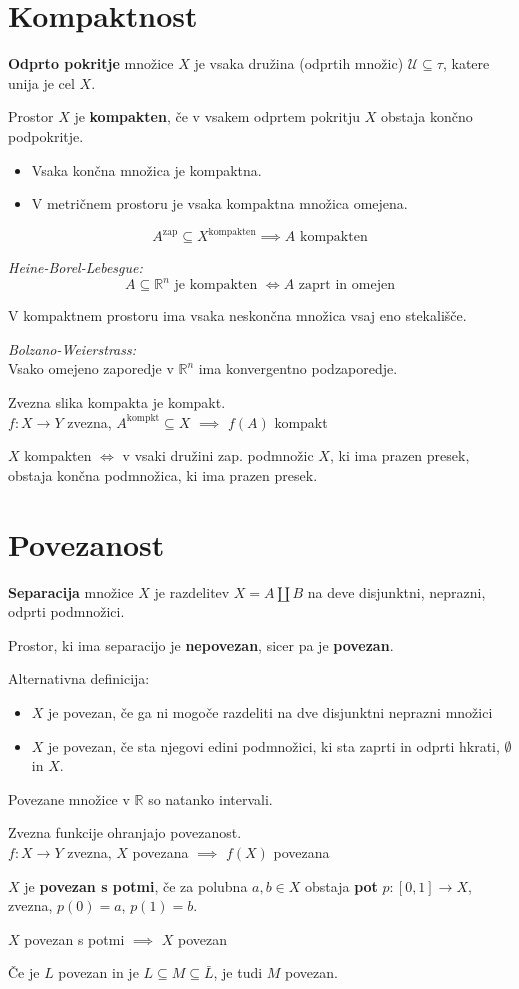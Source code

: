 \section*{Kompaktnost}
\textbf{Odprto pokritje} množice $X$ je vsaka družina (odprtih množic) $\mathcal{U} \subseteq \tau$, katere unija je cel $X$.

Prostor $X$ je \textbf{kompakten}, če v vsakem odprtem pokritju $X$ obstaja končno podpokritje.

\begin{itemize}
	\item Vsaka končna množica je kompaktna.
	\item V metričnem prostoru je vsaka kompaktna množica omejena.
\end{itemize}

\[ A^{\text{zap}} \subseteq X^{\text{kompakten}} \implies A \text{ kompakten} \]

\emph{Heine-Borel-Lebesgue:}
\[ A \subseteq \mathbb{R}^n \text{ je kompakten } \iff A \text{ zaprt in omejen} \]

V kompaktnem prostoru ima vsaka neskončna množica vsaj eno stekališče.

\emph{Bolzano-Weierstrass:}\\
Vsako omejeno zaporedje v $\mathbb{R}^n$ ima konvergentno podzaporedje.

Zvezna slika kompakta je kompakt.\\
$f: X \to Y$ zvezna, $A^\text{kompkt} \subseteq X$ $\implies$ $f(A)$ kompakt

$X$ kompakten $\iff$ v vsaki družini zap. podmnožic $X$, ki ima prazen presek, obstaja končna podmnožica, ki ima prazen presek.

\section*{Povezanost}
\textbf{Separacija} množice $X$ je razdelitev $X = A \amalg B$ na deve disjunktni, neprazni, odprti podmnožici.

Prostor, ki ima separacijo je \textbf{nepovezan}, sicer pa je \textbf{povezan}.

Alternativna definicija:
\begin{itemize}
	\item $X$ je povezan, če ga ni mogoče razdeliti na dve disjunktni neprazni množici
	\item $X$ je povezan, če sta njegovi edini podmnožici, ki sta zaprti in odprti hkrati, $\emptyset$ in $X$.
\end{itemize}

Povezane množice v $\mathbb{R}$ so natanko intervali.

Zvezna funkcije ohranjajo povezanost.\\
$f: X \to Y$ zvezna, $X$ povezana $\implies$ $f(X)$ povezana

$X$ je \textbf{povezan s potmi}, če za polubna $a,b \in X$ obstaja \textbf{pot} $p: [0,1] \to X$, zvezna, $p(0) = a$, $p(1) = b$.

$X$ povezan s potmi $\implies$ $X$ povezan

Če je $L$ povezan in je $L \subseteq M \subseteq \bar{L}$, je tudi $M$ povezan.